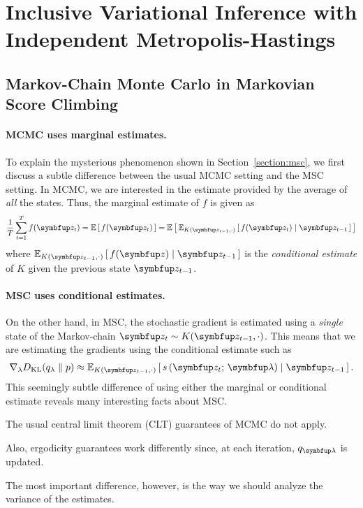 
\section{Inclusive Variational Inference with Independent Metropolis-Hastings}

\subsection{Markov-Chain Monte Carlo in Markovian Score Climbing}\label{section:msc_mcmc}
\paragraph{MCMC uses marginal estimates.}
To explain the mysterious phenomenon shown in Section~\ref{section:msc}, we first discuss a subtle difference between the usual MCMC setting and the MSC setting.
In MCMC, we are interested in the estimate provided by the average of \textit{all} the states.
Thus, the marginal estimate of \(f\) is given as
\begin{align}
  \frac{1}{T} \sum^{T}_{t=1} f(\vz_t) = \E{f(\vz_t)} = \E{\Esub{K(\vz_{t-1},\cdot)}{ f(\vz_t) \mid \vz_{t-1}}}
\end{align}
where \(\Esub{K(\vz_{t-1},\cdot)}{ f(\vz) \mid \vz_{t-1}}\) is the \textit{conditional estimate} of \(K\) given the previous state \(\vz_{t-1}\).

\paragraph{MSC uses conditional estimates.}
On the other hand, in MSC, the stochastic gradient is estimated using a \textit{single} state of the Markov-chain \(\vz_t \sim K(\vz_{t-1}, \cdot)\).
This means that we are estimating the gradients using the conditional estimate such as
\begin{align}
  \nabla_{\lambda} \DKL{q_{\lambda}}{p} \approx \Esub{K(\vz_{t-1},\cdot)}{s\,(\vz_t;\, \vlambda) \mid \vz_{t-1}}.
\end{align}
This seemingly subtle difference of using either the marginal or conditional estimate reveals many interesting facts about MSC.
\begin{enumerate*}[label=(\roman*)]
\item The usual central limit theorem (CLT) guarantees of MCMC do not apply.
\item Also, ergodicity guarantees work differently since, at each iteration, \(q_{\vlambda}\) is updated.
\end{enumerate*}
The most important difference, however, is the way we should analyze the variance of the estimates.

